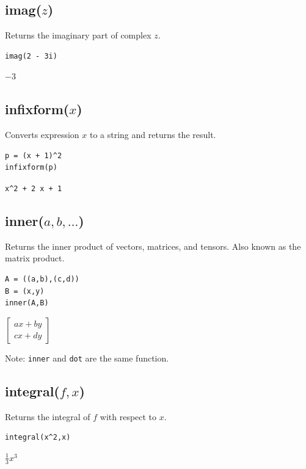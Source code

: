 \documentclass[12pt]{article}
\begin{document}
\subsection*{imag($z$)}

Returns the imaginary part of complex $z$.

{\color{blue}
\begin{verbatim}
imag(2 - 3i)
\end{verbatim}
}

\noindent
$-3$

\subsection*{infixform($x$)}

Converts expression $x$ to a string and returns the result.

{\color{blue}
\begin{verbatim}
p = (x + 1)^2
infixform(p)
\end{verbatim}
}

\noindent
\verb$x^2 + 2 x + 1$

\subsection*{inner($a,b,\ldots$)}

Returns the inner product of vectors, matrices, and tensors.
Also known as the matrix product.

{\color{blue}
\begin{verbatim}
A = ((a,b),(c,d))
B = (x,y)
inner(A,B)
\end{verbatim}
}

\noindent
$\displaystyle
\begin{bmatrix}
ax+by
\\[1ex]
cx+dy
\end{bmatrix}
$

\bigskip
\noindent
Note: {\tt inner} and {\tt dot} are the same function.

\subsection*{integral($f,x$)}

Returns the integral of $f$ with respect to $x$.

{\color{blue}
\begin{verbatim}
integral(x^2,x)
\end{verbatim}
}

\noindent
$\displaystyle \tfrac{1}{3}x^3$
\end{document}
